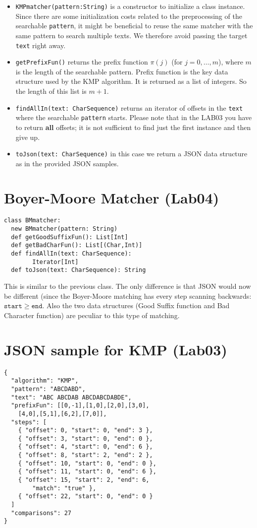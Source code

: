 \documentclass[jou]{apa6}
\begin{document}
\begin{itemize}
\item {\tt KMPmatcher(pattern:String)} is a constructor to 
initialize a class instance. Since there are some initialization costs
related to the preprocessing of the searchable {\tt pattern}, 
it might be beneficial to reuse the same matcher with the same 
pattern to search multiple texts. We therefore avoid passing 
the target {\tt text} right away.
\item {\tt getPrefixFun()} returns the prefix function $\pi(j)$ (for $j=0,\ldots,m$), 
where $m$ is the length of the searchable pattern. 
Prefix function is the key data structure used by the KMP algorithm. 
It is returned as a list of integers. So the length of this
list is $m+1$.
\item {\tt findAllIn(text: CharSequence)} returns an iterator of 
offsets in the {\tt text} where the searchable {\tt pattern} starts. 
Please note that in the LAB03 you have to return {\bf all} offsets; 
it is not sufficient to find just the first instance and then give up.
\item {\tt toJson(text: CharSequence)} in this case we return a 
JSON data structure as in the provided JSON samples.
\end{itemize}


\section{Boyer-Moore Matcher (Lab04)}

\begin{verbatim}
class BMmatcher:
  new BMmatcher(pattern: String)
  def getGoodSuffixFun(): List[Int]
  def getBadCharFun(): List[(Char,Int)]
  def findAllIn(text: CharSequence): 
        Iterator[Int]
  def toJson(text: CharSequence): String
\end{verbatim}

This is similar to the previous class. The only difference is that 
JSON would now be different (since the Boyer-Moore matching has 
every step scanning backwards: $\mathtt{start} \geq \mathtt{end}$.
Also the two data structures (Good Suffix function and Bad Character function) 
are peculiar to this type of matching. 

\section{JSON sample for KMP (Lab03)}

\begin{verbatim}
{
  "algorithm": "KMP",
  "pattern": "ABCDABD",
  "text": "ABC ABCDAB ABCDABCDABDE",
  "prefixFun": [[0,-1],[1,0],[2,0],[3,0],
    [4,0],[5,1],[6,2],[7,0]],
  "steps": [
    { "offset": 0, "start": 0, "end": 3 },
    { "offset": 3, "start": 0, "end": 0 },
    { "offset": 4, "start": 0, "end": 6 },
    { "offset": 8, "start": 2, "end": 2 },
    { "offset": 10, "start": 0, "end": 0 },
    { "offset": 11, "start": 0, "end": 6 },
    { "offset": 15, "start": 2, "end": 6, 
	    "match": "true" },   
    { "offset": 22, "start": 0, "end": 0 }
  ]
  "comparisons": 27
}
\end{verbatim}
\end{document}
